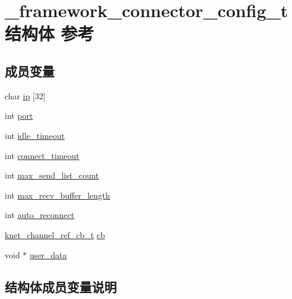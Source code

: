 \hypertarget{a00011}{}\section{\+\_\+framework\+\_\+connector\+\_\+config\+\_\+t结构体 参考}
\label{a00011}
\subsection*{成员变量}
\begin{DoxyCompactItemize}
\item 
char \hyperlink{a00011_a09a135e761eb026e64952e76ca193c1b_a09a135e761eb026e64952e76ca193c1b}{ip} \mbox{[}32\mbox{]}
\item 
int \hyperlink{a00011_a5427527be42630baf3fc0497e74e4d4d_a5427527be42630baf3fc0497e74e4d4d}{port}
\item 
int \hyperlink{a00011_a103e36450fc30baa72acc26b7efd5b98_a103e36450fc30baa72acc26b7efd5b98}{idle\+\_\+timeout}
\item 
int \hyperlink{a00011_a02f7315d98e5e2872fde99130da6b7c8_a02f7315d98e5e2872fde99130da6b7c8}{connect\+\_\+timeout}
\item 
int \hyperlink{a00011_ac6e964a4a4ca24a176016275955a4e05_ac6e964a4a4ca24a176016275955a4e05}{max\+\_\+send\+\_\+list\+\_\+count}
\item 
int \hyperlink{a00011_a7f803ef991aaf690e9b3585c423511d1_a7f803ef991aaf690e9b3585c423511d1}{max\+\_\+recv\+\_\+buffer\+\_\+length}
\item 
int \hyperlink{a00011_a1e36fbcd619adeff0b334ed609b8685e_a1e36fbcd619adeff0b334ed609b8685e}{auto\+\_\+reconnect}
\item 
\hyperlink{a00066_a8a7d96123ef4565c6d08fe58a10476a9_a8a7d96123ef4565c6d08fe58a10476a9}{knet\+\_\+channel\+\_\+ref\+\_\+cb\+\_\+t} \hyperlink{a00011_ab08fced06b6e8f0dda28e4f1d09ad027_ab08fced06b6e8f0dda28e4f1d09ad027}{cb}
\item 
void $\ast$ \hyperlink{a00011_a7aeeb873603639bff576d88e43e52041_a7aeeb873603639bff576d88e43e52041}{user\+\_\+data}
\end{DoxyCompactItemize}


\subsection{结构体成员变量说明}
\hypertarget{a00011_a1e36fbcd619adeff0b334ed609b8685e_a1e36fbcd619adeff0b334ed609b8685e}{}
